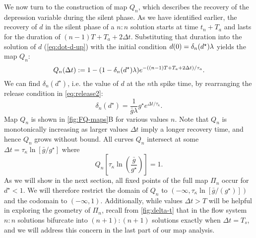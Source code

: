 We now turn to the construction of map $Q_n$, which describes the recovery of the depression variable during the silent phase.
As we have identified earlier, the recovery of $d$ in the silent phase of a $n:n$ solution starts at time $t_{n} + T_{a}$ and lasts for the duration of $(n-1)T + T_{a} + 2\Delta t$.
Substituting that duration into the solution of $d$ (\cref{eq:dot-d-up}) with the initial condition $d(0)=\delta_n(d^\star) \lambda$ yields the map $Q_{n}$:
\begin{equation}
	\label{eq:Qn-map}
	Q_n(\Delta t) := 1- (1- \delta_n(d^\star) \lambda)e^{-((n-1)T + T_{a} + 2\Delta t)/\tau_a}.
\end{equation}
\noindent
{}
We can find $\delta_{n}(d^{\star})$, i.e. the value of $d$ at the $n$th spike time, by rearranging the release condition in \cref{eq:release2}:
\begin{equation}
	\label{eq:dn}
	\delta_{n}(d^{\star}) = \frac{1}{\bar g \lambda} g^\star e^{\Delta t/\tau_\kappa}.
\end{equation}
Map $Q_n$ is shown in \cref{fig:FQ-maps}B for various values $n$.
Note that $Q_n$ is monotonically increasing as larger values $\Delta t$ imply a longer recovery time, and hence $Q_{n}$ grows without bound.
All curves $Q_{n}$ intersect at some $\Delta t = \tau_\kappa\ln{\left[\bar g/g^\star\right]}$ where
\begin{equation}
	\label{eq:Qn-intersect}
	Q_n\left[\tau_\kappa\ln{\left(\frac{\bar g}{g^\star}\right)}\right]=1.
\end{equation}
As we will show in the next section, all fixed points of the full map $\Pi_n$ occur for $d^\star<1$.
We will therefore restrict the domain of $Q_n$ to $(-\infty, \tau_\kappa\ln{\left[\bar g/(g^\star)\right]})$ and the codomain to $(-\infty, 1)$.
Additionally, while values $\Delta t>T$ will be helpful in exploring the geometry of $\Pi_{n}$, recall from \cref{fig:delta-t} that in the flow system $n:n$ solutions bifurcate into $(n+1):(n+1)$ solutions exactly when $\Delta t = T_{s}$, and we will address this concern in the last part of our map analysis.

